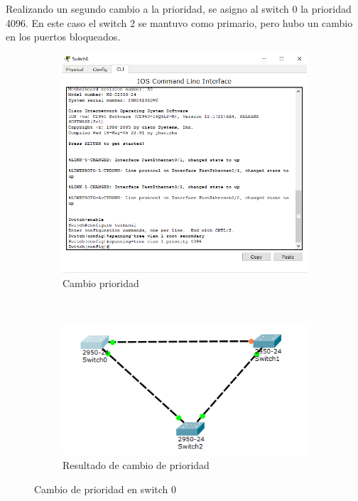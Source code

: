 \documentclass[spanish]{udpreport}
\begin{document}
Realizando un segundo cambio a la prioridad, se asigno al switch 0 la prioridad 4096. En este caso el switch 2 se mantuvo como primario, pero hubo un cambio en los puertos bloqueados.

\begin{figure}[htb]
    \centering
     \begin{subfigure}[b]{0.3\textwidth}
        \includegraphics[width=\textwidth]{photos/switch_0_prioridad_4096.png}
        \caption{Cambio prioridad} \label{fig:photos/switch_0_prioridad_4096.png}
    \end{subfigure}
    ~
    \begin{subfigure}[b]{0.3\textwidth}
        \includegraphics[width=\textwidth]{photos/resultado_cambio_prioridad_2.png}
        \caption{Resultado de cambio de prioridad} \label{fig:photos/resultado_cambio_prioridad_2.png}
    \end{subfigure}
    	\caption{Cambio de prioridad en switch 0}
\end{figure}
\end{document}
